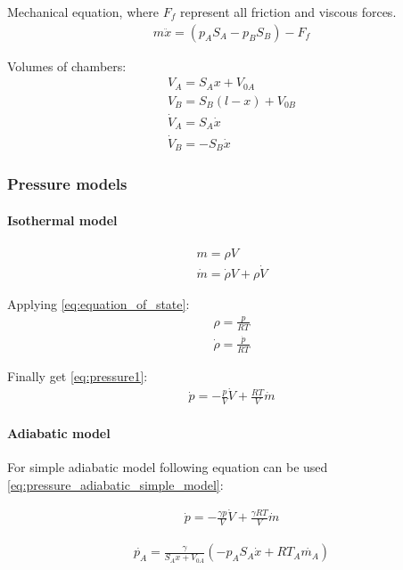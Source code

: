 \documentclass[class=article, crop=false]{standalone}
\begin{document}
Mechanical equation, where $F_f$ represent all friction and viscous forces.
\begin{align}
    m\ddot{x} = (p_A S_A - p_B S_B) - F_f
\end{align}

Volumes of chambers:
\begin{align}
    V_A = S_A x + V_{0A} \\
    V_B = S_B (l-x) + V_{0B} \\
    \dot{V}_A = S_A \dot{x} \\
    \dot{V}_B = - S_B \dot{x}
\end{align}

\subsubsection{Pressure models}

\paragraph{Isothermal model}
\begin{align}
    m = \rho V \\
    \dot{m} = \dot{\rho} V + \rho \dot{V}
\end{align}

Applying \ref{eq:equation_of_state}:
\begin{align}
    \rho = \frac{p}{RT} \\
    \dot{\rho} = \frac{\dot{p}}{RT} 
\end{align}

Finally get \ref{eq:pressure1}:
\begin{align}
    \dot{p} = - \frac{p}{V}\dot{V} + \frac{RT}{V}\dot{m}
    \label{eq:pressure1}
\end{align}

\paragraph{Adiabatic model} 
For simple adiabatic model following equation can be used
\ref{eq:pressure_adiabatic_simple_model}:

\begin{align}
    \dot{p} = - \frac{\gamma p}{V}\dot{V} + \frac{\gamma RT}{V}\dot{m}
    \label{eq:pressure_adiabatic_simple_model}
\end{align}

\begin{align}
    \dot{p_A} = \frac{\gamma}{S_A x + V_{0A}} \left(- p_A S_A\dot{x} + RT_A\dot{m_A}
    \right)
\end{align}
\end{document}
